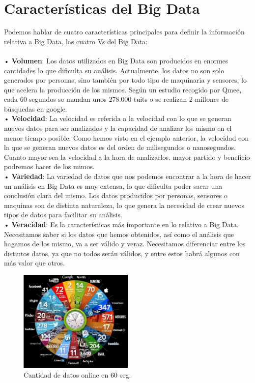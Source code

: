 \section{Características del Big Data}

Podemos hablar de cuatro características principales para definir la información relativa a Big Data, las cuatro Vs del Big Data:\\\\

•	\textbf{Volumen}: Los datos utilizados en Big Data son producidos en enormes cantidades lo que dificulta su análisis. Actualmente, los datos no son solo generados por personas, sino también por todo tipo de maquinaria y sensores, lo que acelera la producción de los mismos. Según un estudio recogido por Qmee, cada 60 segundos se mandan unos 278.000 tuits o se realizan 2 millones de búsquedas en google.
\cite{blog_qmee}
\\

•	\textbf{Velocidad}: La velocidad es referida a la velocidad con lo que se generan nuevos datos para ser analizados y la capacidad de analizar los mismo en el menor tiempo posible. Como hemos visto en el ejemplo anterior, la velocidad con la que se generan nuevos datos es del orden de milisegundos o nanosegundos. Cuanto mayor sea la velocidad a la hora de analizarlos, mayor partido y beneficio podremos hacer de los mimos.
\\

•	\textbf{Variedad}: La variedad de datos que nos podemos encontrar a la hora de hacer un análisis en Big Data es muy extensa, lo que dificulta poder sacar una conclusión clara del mismo. Los datos producidos por personas, sensores o maquinas son de distinta naturaleza, lo que genera la necesidad de crear  nuevos tipos de datos para  facilitar su análisis.
\\

•	\textbf{Veracidad}: Es la características más importante en lo relativo a Big Data. Necesitamos saber si los datos que hemos obtenidos, así como el análisis que hagamos de los mismo, va a ser válido y veraz. Necesitamos diferenciar entre los distintos datos, ya que no todos serán válidos, y entre estos habrá algunos con más valor que otros. \\


\begin{figure}[H]
	\centering
	\includegraphics[width=0.5\textwidth]{./imagenes/Estudio_Qmee}
	\caption{Cantidad de datos online en 60 seg. \cite{blog_qmee}} 
	
\end{figure}



